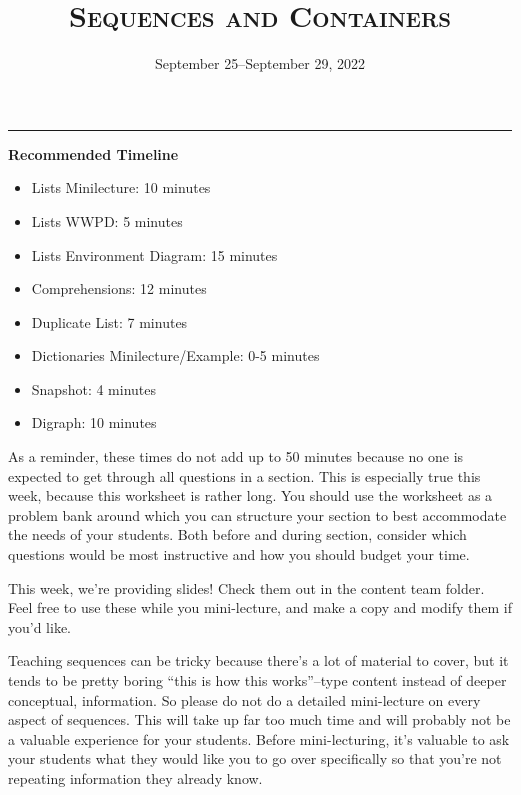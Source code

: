 \documentclass{exam}
\title{\textsc{Sequences and Containers}}
\date{September 25--September 29, 2022}
\begin{document}
\maketitle
\rule{\textwidth}{0.15em}
\fontsize{12}{15}\selectfont


\begin{meta}
    \textbf{Recommended Timeline}
    \begin{itemize}
        \item Lists Minilecture: 10 minutes
        \item Lists WWPD: 5 minutes
        \item Lists Environment Diagram: 15 minutes
        \item Comprehensions: 12 minutes
        \item Duplicate List: 7 minutes
        \item Dictionaries Minilecture/Example: 0-5 minutes
        \item Snapshot: 4 minutes
        \item Digraph: 10 minutes
    \end{itemize}

    As a reminder, these times do not add up to 50 minutes because no one is expected 
    to get through all questions in a section. This is especially true this week, 
    because this worksheet is rather long. You should use the worksheet as a problem bank
    around which you can structure your section to best accommodate the needs of your 
    students. Both before and during section, consider which questions would be most 
    instructive and how you should budget your time.

    This week, we're providing slides! Check them out in the content team folder. 
    Feel free to use these while you mini-lecture, and make a copy and modify them 
    if you'd like. 

    Teaching sequences can be tricky because there's a lot of material to cover, but 
    it tends to be pretty boring ``this is how this works''–type content instead of 
    deeper conceptual, information. So please do not do a detailed 
    mini-lecture on every aspect of sequences. This will take up far too much time and 
    will probably not be a valuable experience for your students. Before mini-lecturing, 
    it's valuable to ask your students what they would like you to go over specifically 
    so that you're not repeating information they already know. 
\end{meta}
\end{document}
